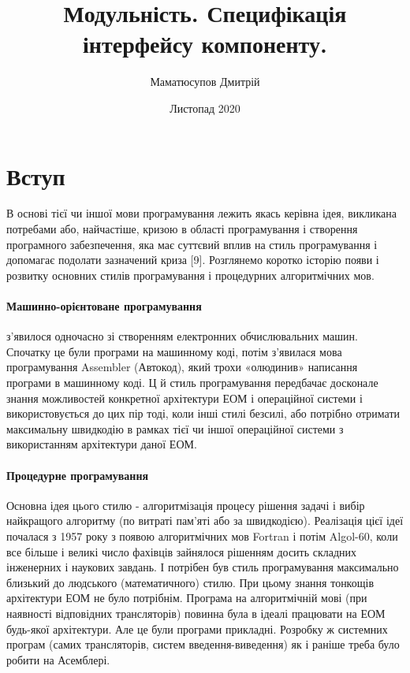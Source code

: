 \documentclass[a4paper,14pt, titlepage]{article}
\title{Модульність. Специфікація інтерфейсу компоненту.}
\author{Маматюсупов Дмитрій}
\date{Листопад 2020}
\begin{document}
\maketitle

\tableofcontents


\section{Вступ}
В основі тієї чи іншої мови програмування лежить якась керівна ідея,
викликана потребами або, найчастіше, кризою в області програмування і
створення програмного забезпечення, яка має суттєвий вплив на стиль
програмування і допомагає подолати зазначений криза [9]. Розглянемо
коротко історію появи і розвитку основних стилів програмування і
процедурних алгоритмічних мов.


\paragraph{Машинно-орієнтоване програмування}
з'явилося одночасно зі створенням електронних обчислювальних машин.
Спочатку це були програми на машинному коді, потім з'явилася мова
програмування Assembler (Автокод), який трохи «олюдинив» написання
програми в машинному коді. Ц й стиль програмування передбачає
досконале знання можливостей конкретної архітектури ЕОМ і операційної
системи і використовується до цих пір тоді, коли інші стилі безсилі, або
потрібно отримати максимальну швидкодію в рамках тієї чи іншої
операційної системи з використанням архітектури даної ЕОМ.

\paragraph{Процедурне програмування}
Основна ідея цього стилю - алгоритмізація процесу рішення задачі і вибір
найкращого алгоритму (по витраті пам'яті або за швидкодією). Реалізація
цієї ідеї почалася з 1957 року з появою алгоритмічних мов Fortran і
потім Algol-60, коли все більше і великі число фахівців зайнялося
рішенням досить складних інженерних і наукових завдань. І потрібен був
стиль програмування максимально близький до людського (математичного)
стилю. При цьому знання тонкощів архітектури ЕОМ не було потрібнім.
Програма на алгоритмічній мові (при наявності відповідних трансляторів)
повинна була в ідеалі працювати на ЕОМ будь-якої архітектури. Але це
були програми прикладні. Розробку ж системних програм (самих
трансляторів, систем введення-виведення) як і раніше треба було робити
на Асемблері.
\end{document}
